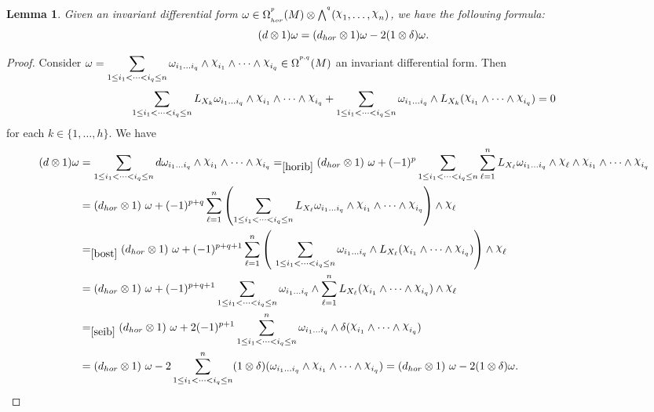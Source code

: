 \documentclass[a4paper,oneside,10pt,reqno]{amsart}
\newtheorem{lemma}[theorem]{Lemma}
\theoremstyle{definition}
\newcommand\chii{\raise2pt\hbox{$\chi$}}
\newcommand\Om{\Omega}
\newcommand\om{\omega}
\newcommand{\id}{{\large 1}}
\newcommand{\bi}[2]{{#1}^{^{#2}}}
\newcommand{\lau}[4]{{#1}^{^{#2}}_{_{#3}}{\left( #4 \right)}}
\newcommand{\coho}[3]{{#1}^{^{#2}}{\left( #3 \right)}}
\begin{document}
\begin{lemma}\label{azer} 
Given an invariant differential form $\omega \in  \lau \Om p{hor} M \otimes \bi \bigwedge q (\chii_1, \ldots,\chii_n)$, we have the following formula:
$$
(d\otimes \id)  \omega
= (d_{hor} \otimes \id)\omega  -   2  (\id \otimes \delta)\omega.
$$
\end{lemma}
\begin{proof}
 Consider 
 $\displaystyle \omega  = \sum_{1\leq i_1< \cdots < i_q  \leq n}  \omega_{i_1 \ldots i_q}   \wedge \chii_{i_1} \wedge \cdots \wedge \chii_{i_q}  \in   \coho {\Om}{p,q}{M}$ an 
invariant differential form. Then
 \begin{equation}\label{bost}
 \sum_{1\leq i_1< \cdots < i_q  \leq n}  L_{X_k} \omega_{i_1 \ldots i_q}  \wedge \chii_{i_1} \wedge \cdots \wedge \chii_{i_q} +  \sum_{1\leq i_1< \cdots < i_q  \leq n}  \omega_{i_1 \ldots i_q}  \wedge L_{X_k}( \chii_{i_1} \wedge \cdots \wedge \chii_{i_q} )= 0
 \end{equation}
 for each $k\in\{1,\ldots,h\}$.
We have
 \begin{align*}
 (d\otimes \id) \om &= \sum_{1\leq i_1< \cdots < i_q  \leq n}  d \omega_{i_1 \ldots i_q}\wedge  \chii_{i_1} \wedge \cdots \wedge \chii_{i_q} 
  =_{\eqref{horib}}
  (d_{hor} \otimes \id) \ \omega +
 (-1)^{p}\sum_{1\leq i_1< \cdots < i_q  \leq n}  \sum_{\ell=1} ^n  L_{X_\ell} \omega_{i_1 \ldots i_q} \wedge \chii_\ell \wedge \chii_{i_1} \wedge \cdots \wedge \chii_{i_q} 
\\
  &=(d_{hor} \otimes \id)
   \ \omega + (-1)^{p+q} 
   \sum_{\ell=1} ^n   \left(\sum_{1\leq i_1< \cdots < i_q  \leq n}  L_{X_\ell}\omega_{i_1 \ldots i_q}  \wedge \chii_{i_1} \wedge \cdots \wedge \chii_{i_q} \right)\wedge \chii_\ell 
   \\
 &=_{\eqref{bost}} 
 (d_{hor} \otimes \id) \ \omega 
   + (-1)^{p+q+1}\sum_{\ell=1} ^n   \left(\  \sum_{1\leq i_1< \cdots < i_q  \leq n}  \omega_{i_1 \ldots i_q}  \wedge L_{X_\ell}( \chii_{i_1} \wedge \cdots \wedge \chii_{i_q} )\right)\wedge \chii_\ell  
   \\
   &=
(d_{hor} \otimes \id) \ \omega  +  (-1)^{p+q+1}  \sum_{1\leq i_1< \cdots < i_q  \leq n}  \omega_{i_1 \ldots i_q}  \wedge    \sum_{\ell=1} ^n L_{X_\ell}( \chii_{i_1} \wedge \cdots \wedge \chii_{i_q} ) \wedge \chii_\ell  
  \\
   &=_{\eqref{seib}} 
   (d_{hor} \otimes \id) \ \omega  +   2(-1)^{p+1}    \sum_{1\leq i_1< \cdots < i_q  \leq n} ^n   \omega_{i_1 \ldots i_q}
     \wedge  \delta(\chii_{i_1} \wedge \cdots \wedge \chii_{i_q}) 
     \\
   &=
(d_{hor} \otimes \id) \ \omega   -  2  \sum_{1\leq i_1< \cdots < i_q  \leq n} ^n   (\id \otimes \delta) (\omega_{i_1 \ldots i_q}
     \wedge  \chii_{i_1} \wedge \cdots \wedge \chii_{i_q} ) 
=
    (d_{hor} \otimes \id) \ \omega   -  2   (\id \otimes \delta) \omega.   \qedhere
 \end{align*}
\end{proof}
\end{document}
